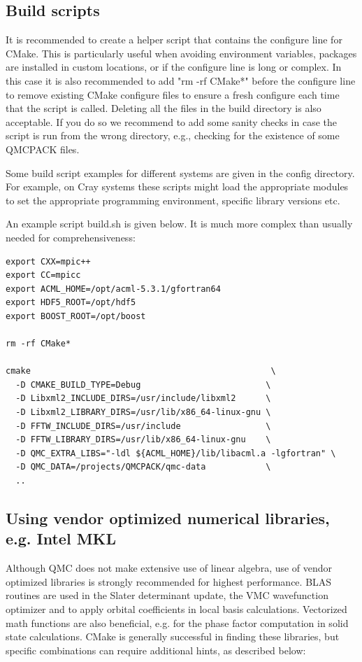 \subsection{Build scripts}
It is recommended to create a helper script that contains the
configure line for CMake.  This is particularly useful when avoiding
environment variables, packages are installed in custom locations,
or if the configure line is long or complex.  In this case it is also
recommended to add "rm -rf CMake*" before the configure line to remove
existing CMake configure files to ensure a fresh configure each time
that the script is called. Deleting all the files in the build
directory is also acceptable. If you do so we recommend to add some sanity
checks in case the script is run from the wrong directory, e.g.,
checking for the existence of some QMCPACK files.

Some build script examples for different systems are given in the
config directory. For example, on Cray systems these scripts might
load the appropriate modules to set the appropriate programming
environment, specific library versions etc.

An example script build.sh is given below. It is much more complex
than usually needed for comprehensiveness:

\verbatimfont{\footnotesize}
\begin{verbatim}
export CXX=mpic++
export CC=mpicc
export ACML_HOME=/opt/acml-5.3.1/gfortran64
export HDF5_ROOT=/opt/hdf5
export BOOST_ROOT=/opt/boost

rm -rf CMake*

cmake                                                \
  -D CMAKE_BUILD_TYPE=Debug                         \
  -D Libxml2_INCLUDE_DIRS=/usr/include/libxml2      \
  -D Libxml2_LIBRARY_DIRS=/usr/lib/x86_64-linux-gnu \
  -D FFTW_INCLUDE_DIRS=/usr/include                 \
  -D FFTW_LIBRARY_DIRS=/usr/lib/x86_64-linux-gnu    \
  -D QMC_EXTRA_LIBS="-ldl ${ACML_HOME}/lib/libacml.a -lgfortran" \
  -D QMC_DATA=/projects/QMCPACK/qmc-data            \
  ..
\end{verbatim}

\subsection{Using vendor optimized numerical libraries, e.g. Intel MKL}

Although QMC does not make extensive use of linear algebra, use of
vendor optimized libraries is strongly recommended for highest
performance. BLAS routines are used in the Slater determinant update, the VMC wavefunction optimizer
and to apply orbital coefficients in local basis calculations. Vectorized
math functions are also beneficial, e.g. for the phase factor
computation in solid state calculations. CMake is generally successful
in finding these libraries, but specific combinations can require
additional hints, as described below:

